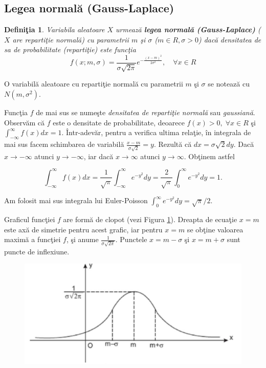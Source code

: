 \documentclass[12pt]{article}
\newtheorem{definitie}{Definiţia}[subsection]
\begin{document}
\subsection{Legea normală (Gauss-Laplace)}

\begin{definitie}
	Variabila aleatoare $X$ urmează \textbf{legea normală (Gauss-Laplace)} ($X$ are repartiţie normală) cu parametrii $m$ şi $\sigma$ ($m \in R, \sigma > 0$) dacă densitatea de sa de probabilitate (repartiţie) este funcţia
	\begin{equation}
		f(x;m, \sigma) = \frac{1}{\sigma\sqrt{2\pi}} e^{-\frac{(x-m)^2}{2\sigma^2}}, \quad \forall x \in R
	\end{equation}
\end{definitie}

O variabilă aleatoare cu repartiţie normală cu parametrii $m$ şi $\sigma$ se notează cu $N(m, \sigma^2)$.

Funcţia $f$ de mai sus se numeşte \textit{densitatea de repartiţie normală} sau \textit{gaussiană}. Observăm că $f$ este o densitate de probabilitate, deoarece $f(x) > 0, \; \forall x \in R$ şi $\int_{-\infty}^\infty f(x)dx = 1$. Într-adevăr, pentru a verifica ultima relaţie, în integrala de mai sus facem schimbarea de variabilă $\frac{x-m}{\sigma\sqrt{2}} = y$. Rezultă că $dx = \sigma\sqrt{2}dy$. Dacă $x \to -\infty$ atunci $y \to -\infty$, iar dacă $x \to \infty$ atunci $y \to \infty$. Obţinem astfel

\begin{equation*}
\int_{-\infty}^\infty f(x)dx = \frac{1}{\sqrt{\pi}} \int_{-\infty}^\infty e^{-y^2} dy = \frac{2}{\sqrt{\pi}} \int_0^\infty e^{-y^2} dy = 1.
\end{equation*}

\noindent Am folosit mai sus integrala lui Euler-Poisson $\int_0^\infty e^{-y^2}dy = \sqrt{\pi}/2$.


Graficul funcţiei $f$ are formă de clopot (vezi Figura \ref{fig:grafic}). Dreapta de ecuaţie $x=m$ este axă de simetrie pentru acest grafic, iar pentru $x=m$ se obţine valoarea maximă a funcţiei $f$, şi anume $\frac{1}{\sigma \sqrt{2\pi}}$. Punctele $x=m-\sigma$ şi $x=m+\sigma$ sunt puncte de inflexiune.

\begin{figure}
	\vspace{.2\paperheight}
	\begin{center}
	\includegraphics[width=.6\textwidth]{grafic}
	\end{center}
	\caption{\label{fig:grafic}} 
\end{figure}
\end{document}
